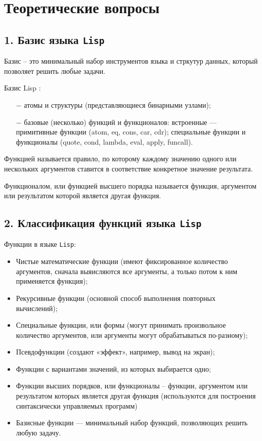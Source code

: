 \section*{Теоретические вопросы}

\subsection*{1. Базис языка {\texttt{Lisp}}}

Базис -- это минимальный набор инструментов языка и стркутур данных, который позволяет решить любые задачи.

Базис Lisp :

\begin{itemize}
	\item[$-$] атомы и структуры (представляющиеся бинарными узлами);
	\item[$-$] базовые (несколько) функций и функционалов: встроенные — примитивные 
	функции (atom, eq, cons, car, cdr); специальные функции и функционалы (quote, 
	cond, lambda, eval, apply, funcall).
\end{itemize}
	
Функцией называется правило, по которому каждому значению одного или нескольких  аргументов ставится в соответствие конкретное значение результата.

Функционалом, или функцией высшего порядка называется функция, аргументом или  результатом которой является другая функция.

\subsection*{2. Классификация функций языка {\texttt{Lisp}}}

Функции в языке {\texttt{Lisp}}:
\begin{itemize}
	\item Чистые математические функции (имеют фиксированное количество аргументов, сначала выяисляются все аргументы, а только потом к ним применяется функция);
	\item Рекурсивные функции (основной способ выполнения повторных вычислений);
	\item Специальные функции, или формы (могут принимать произвольное количество аргументов, или аргументы могут обрабатываться по-разному);
	\item Псевдофункции (создают «эффект», например, вывод на экран);
	\item Функции с вариантами значений, из которых выбирается одно;
	\item Функции высших порядков, или функционалы --  функции, аргументом или  результатом которых является другая функция (используются для построения синтаксически управляемых программ)
	\item Базисные функции --- минимальный набор функций, позволяющих решить любую задачу.
\end{itemize}

